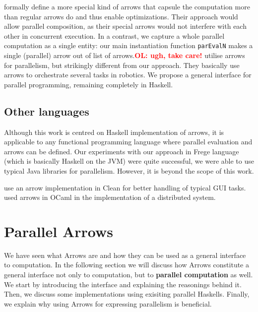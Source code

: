 \documentclass{jfp1}
\newcommand{\inlinecode}[1]{\texttt{#1}}
\newcommand{\comm}[2]{\textcolor{red}{\bfseries #1: #2}}
\newcommand{\olcomment}[1]{\comm{OL}{#1}}
\begin{document}
\citet{Liu:2009:CCA:1631687.1596559} formally define a more special kind of arrows that capsule the computation more than regular arrows do and thus enable optimizations. Their approach would allow parallel composition, as their special arrows would not interfere with each other in concurrent execution. In a contrast, we capture a whole parallel computation as a single entity: our main instantiation function \inlinecode{parEvalN} makes a single (parallel) arrow out of list of arrows.\olcomment{ugh, take care!}
\citet{Huang2007} utilise arrows for parallelism, but strikingly different from our approach. They basically use arrows to orchestrate several tasks in robotics. We propose a general interface for parallel programming, remaining completely in Haskell.

\subsection{Other languages}

Although this work is centred on Haskell implementation of arrows, it is applicable to any functional programming language where parallel evaluation and arrows can be defined. Our experiments with our approach in Frege language (which is basically Haskell on the JVM) were quite successful, we were able to use typical Java libraries for parallelism. However, it is beyond the scope of this work.

\citet{achten2004arrows,achten2007arrow} use an arrow implementation in Clean for better handling of typical GUI tasks. \citet{Dagand:2009:ORD:1481861.1481870} used arrows in OCaml in the implementation of a distributed system.


	\section{Parallel Arrows}
\label{sec:parallel-arrows}
We have seen what Arrows are and how they can be used as a general interface to computation. In the following section we will discuss how Arrows constitute a general interface not only to computation, but to \textbf{parallel computation} as well. We start by introducing the interface and explaining the reasonings behind it. Then, we discuss some implementations using exisiting parallel Haskells. Finally, we explain why using Arrows for expressing parallelism is beneficial.
\end{document}
